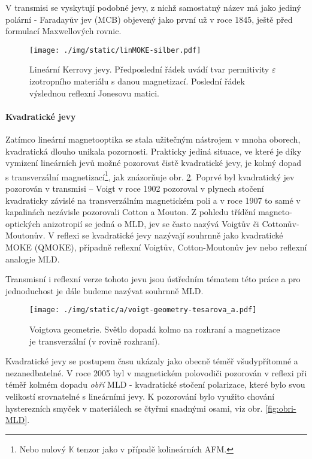 V transmisi se vyskytují podobné jevy, z nichž samostatný název má jako jediný polární - Faradayův jev (MCB) objevený jako první už v roce 1845, ještě před formulací Maxwellových rovnic\cite{zvezdinModernMagnetoopticsMagnetooptical1997}.

\begin{figure}[htbp]
    \centering
    \texttt{[image: ./img/static/linMOKE-silber.pdf]}
    \caption{Lineární Kerrovy jevy. Předposlední řádek uvádí tvar permitivity $\varepsilon$ izotropního materiálu s danou magnetizací. Poslední řádek výslednou reflexní Jonesovu matici. \cite{silberQuadraticMagnetoopticKerr2019a}}
    \label{fig:MOKE-Silber}
\end{figure}

\paragraph{Kvadratické jevy}

Zatímco lineární magnetooptika se stala užitečným nástrojem v mnoha oborech, kvadratická dlouho unikala pozornosti.
Prakticky jediná situace, ve které je díky vymizení lineárních jevů možné pozorovat čistě kvadratické jevy, je kolmý dopad s transverzální magnetizací\footnote{Nebo nulový $\mathbb{K}$ tenzor jako v případě kolineárních AFM.}, jak znázorňuje obr. \ref{fig:Voigtova-geometrie}.
Poprvé byl kvadratický jev pozorován v transmisi -- Voigt v roce 1902 pozoroval v plynech stočení kvadraticky závislé na transverzálním magnetickém poli a v roce 1907 to samé v kapalinách nezávisle pozorovali Cotton a Mouton\cite{zvezdinModernMagnetoopticsMagnetooptical1997}.
Z pohledu třídění magneto-optických anizotropií se jedná o MLD, jev se často nazývá Voigtův či Cottonův-Moutonův.
V reflexi se kvadratické jevy nazývají souhrnně jako kvadratické MOKE (QMOKE), případně reflexní Voigtův, Cotton-Moutonův jev nebo reflexní analogie MLD.

Transmisní i reflexní verze tohoto jevu jsou ústředním tématem této práce a pro jednoduchost je dále budeme nazývat souhrnně MLD.

\begin{figure}[htbp]
    \centering
    \texttt{[image: ./img/static/a/voigt-geometry-tesarova\_a.pdf]}
    \caption{Voigtova geometrie. Světlo dopadá kolmo na rozhraní a magnetizace je transverzální (v rovině rozhraní). \cite{tesarovaSystematicStudyMagnetic2014}}
    \label{fig:Voigtova-geometrie}
\end{figure}

Kvadratické jevy se postupem času ukázaly jako obecně téměř všudypřítomné a nezanedbatelné.
V roce 2005 byl v magnetickém polovodiči  pozorován v reflexi při téměř kolmém dopadu \emph{obří} MLD - kvadratické stočení polarizace, které bylo svou velikostí srovnatelné s lineárními jevy\cite{kimelObservationGiantMagnetic2005}.
K pozorování bylo využito chování hysterezních smyček v materiálech se čtyřmi snadnými osami, viz obr. \ref{fig:obri-MLD}.

